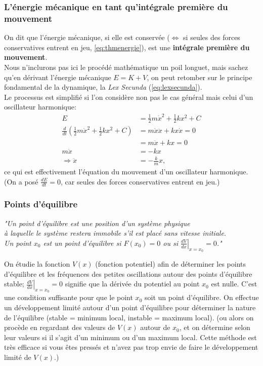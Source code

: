 \documentclass{article}
\numberwithin{equation}{section}
\begin{document}
\subsubsection{L'énergie mécanique en tant qu'intégrale première du mouvement}
On dit que l'énergie mécanique, si elle est conservée (\(\Leftrightarrow\) si seules des forces conservatives entrent en jeu, \ref{eq:thmenergie}), est une \textbf{intégrale première du mouvement}. \\

Nous n'inclurons pas ici le procédé mathématique un poil longuet, mais sachez qu'en dérivant l'énergie mécanique \(E = K + V\), on peut retomber sur le principe fondamental de la dynamique, la \emph{Lex Secunda} (\ref{eq:lexsecunda}). \\
Le processus est simplifié si l'on considère non pas le cas général mais celui d'un oscillateur harmonique:
\begin{align*}
	E &= \frac{1}{2} m \dot x^2 + \frac{1}{2} k x^2 + C \\
	\frac{d}{dt}\left ( \frac{1}{2} m \dot x^2 + \frac{1}{2} k x^2 + C \right ) &= m \dot x \ddot x + k x \dot x = 0 \\
	&= m \ddot x + k x = 0 \\
	m \ddot x &= -k x \\
	\Rightarrow \ddot x &= -\frac{k}{m} x,
\end{align*}
ce qui est effectivement l'équation du mouvement d'un oscillateur harmonique. \\
(On a posé \(\frac{dE}{dt} = 0\), car seules des forces conservatives entrent en jeu.)

\subsubsection{Points d'équilibre}
\begin{center}
	\emph{"Un point d'équilibre est une position d'un système physique \\ à laquelle le système restera immobile s'il est placé sans vitesse initiale. \\ Un point \(x_0\) est un point d'équilibre si \(F(x_0) = 0\) ou si \(\left . \frac{dV}{dx} \right \rvert_{x=x_0} = 0\)."} %
\end{center}
On étudie la fonction \(V(x)\) (fonction potentiel) afin de déterminer les points d'équilibre et les fréquences des petites oscillations autour des points d'équilibre stable; \(\left . \frac{dV}{dx} \right \rvert_{x=x_0} = 0\) signifie que la dérivée du potentiel au point \(x_0\) est nulle. C'est une condition suffisante pour que le point \(x_0\) soit un point d'équilibre. On effectue un développement limité autour d'un point d'équilibre pour déterminer la nature de l'équilibre (stable = minimum local, instable = maximum local). (ou alors on procède en regardant des valeurs de \(V(x)\) autour de \(x_0\), et on détermine selon leur valeurs si il s'agit d'un minimum ou d'un maximum local. Cette méthode est très efficace si vous êtes pressés et n'avez pas trop envie de faire le développement limité de \(V(x)\).)
\end{document}
